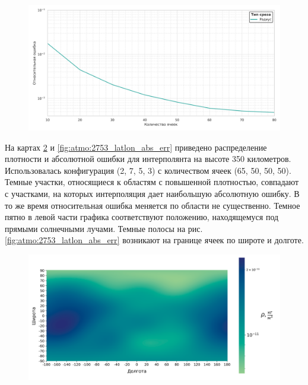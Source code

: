  \begin{figure}[h!]
    \centering
    \includegraphics[width=\linewidth]{../images/solution/atmo/2357_rho.png}
    \label{fig:atmo:2357_rho}
 \end{figure}

 На картах \ref{fig:atmo:2753_latlon} и \ref{fig:atmo:2753_latlon_abs_err} приведено
 распределение плотности и абсолютной ошибки для интерполянта на высоте 350 километров.
 Использовалась конфигурация (2, 7, 5, 3) с количеством ячеек (65, 50, 50, 50). Темные участки, относящиеся к областям с
 повышенной плотностью, совпадают с участками, на которых интерполяция дает наибольшую абсолютную ошибку.
 В то же время относительная ошибка меняется по области не существенно. Темное пятно в левой
 части графика соответствуют положению, находящемуся под прямыми солнечными лучами.
 Темные полосы на рис. \ref{fig:atmo:2753_latlon_abs_err} возникают на границе ячеек
 по широте и долготе. 

 \begin{figure}[h!]
    \centering
    \includegraphics[width=\linewidth]{../images/solution/atmo/2753_latlon_direct_val_heatmap.png}
    \label{fig:atmo:2753_latlon}
 \end{figure}

